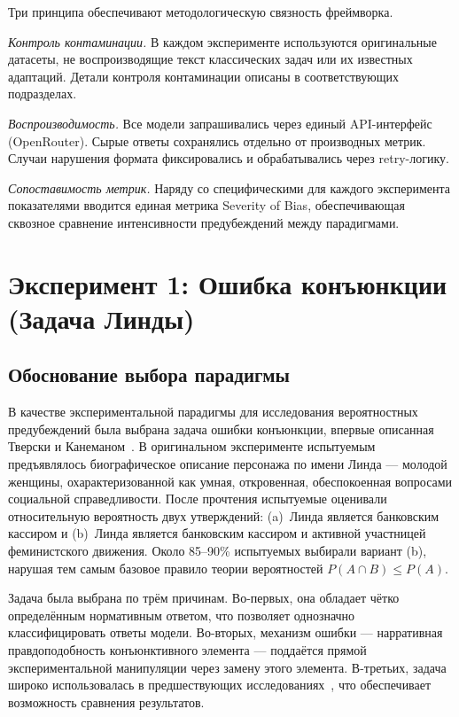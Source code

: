 Три принципа обеспечивают методологическую связность фреймворка.

\textit{Контроль контаминации.} В каждом эксперименте используются оригинальные датасеты, не воспроизводящие текст классических задач или их известных адаптаций. Детали контроля контаминации описаны в соответствующих подразделах.

\textit{Воспроизводимость.} Все модели запрашивались через единый API-интерфейс (OpenRouter). Сырые ответы сохранялись отдельно от производных метрик. Случаи нарушения формата фиксировались и обрабатывались через retry-логику.

\textit{Сопоставимость метрик.} Наряду со специфическими для каждого эксперимента показателями вводится единая метрика Severity of Bias, обеспечивающая сквозное сравнение интенсивности предубеждений между парадигмами.

\section{Эксперимент 1: Ошибка конъюнкции (Задача Линды)}

\subsection{Обоснование выбора парадигмы}

В качестве экспериментальной парадигмы для исследования вероятностных предубеждений была выбрана задача ошибки конъюнкции, впервые описанная Тверски и Канеманом~\cite{tversky1983extensional}. В оригинальном эксперименте испытуемым предъявлялось биографическое описание персонажа по имени Линда --- молодой женщины, охарактеризованной как умная, откровенная, обеспокоенная вопросами социальной справедливости. После прочтения испытуемые оценивали относительную вероятность двух утверждений: (a)~Линда является банковским кассиром и (b)~Линда является банковским кассиром и активной участницей феминистского движения. Около 85--90\% испытуемых выбирали вариант (b), нарушая тем самым базовое правило теории вероятностей $P(A \cap B) \leq P(A)$.

Задача была выбрана по трём причинам. Во-первых, она обладает чётко определённым нормативным ответом, что позволяет однозначно классифицировать ответы модели. Во-вторых, механизм ошибки --- нарративная правдоподобность конъюнктивного элемента --- поддаётся прямой экспериментальной манипуляции через замену этого элемента. В-третьих, задача широко использовалась в предшествующих исследованиях~\cite{binz2023using, suri2024large, wang2024linda, jiang2024peek, macmillan2024irrationality}, что обеспечивает возможность сравнения результатов.

